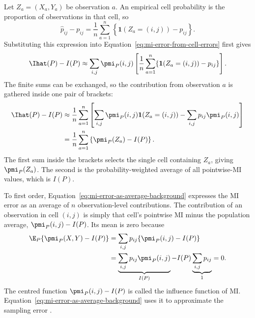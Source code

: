 Let \(Z_a=(X_a,Y_a)\) be observation \(a\). An empirical cell probability is
the proportion of observations in that cell, so
\begin{equation}
  \widehat p_{ij}-p_{ij}
  =
  \frac{1}{n}\sum_{a=1}^{n}
  \left\{\mathbf 1(Z_a=(i,j))-p_{ij}\right\}.
  \label{eq:cell-error-as-average}
\end{equation}
Substituting this expression into Equation~\eqref{eq:mi-error-from-cell-errors}
first gives
\begin{equation}
  \Ihat(P)-I(P)
  \approx
  \sum_{i,j}\pmi_P(i,j)
  \left[
    \frac{1}{n}\sum_{a=1}^{n}
    \{\mathbf 1(Z_a=(i,j))-p_{ij}\}
  \right].
  \label{eq:mi-error-double-sum-background}
\end{equation}
The finite sums can be exchanged, so the contribution from observation \(a\)
is gathered inside one pair of brackets:
\begin{align}
  \Ihat(P)-I(P)
  &\approx
  \frac{1}{n}\sum_{a=1}^{n}
  \left[
    \sum_{i,j}\pmi_P(i,j)\mathbf 1(Z_a=(i,j))
    -\sum_{i,j}p_{ij}\pmi_P(i,j)
  \right]
  \notag\\
  &=\frac{1}{n}\sum_{a=1}^{n}
  \left\{\pmi_P(Z_a)-I(P)\right\}.
  \label{eq:mi-error-as-average-background}
\end{align}
The first sum inside the brackets selects the single cell containing
\(Z_a\), giving \(\pmi_P(Z_a)\). The second is the probability-weighted
average of all pointwise-MI values, which is \(I(P)\).

To first order, Equation~\eqref{eq:mi-error-as-average-background} expresses
the MI error as an average of \(n\) observation-level contributions.
The contribution of an observation in cell \((i,j)\) is simply that cell's
pointwise MI minus the population average, \(\pmi_P(i,j)-I(P)\). Its mean is
zero because
\begin{align}
  \E_P\{\pmi_P(X,Y)-I(P)\}
  &=\sum_{i,j}p_{ij}\{\pmi_P(i,j)-I(P)\}
  \notag\\
  &=\underbrace{\sum_{i,j}p_{ij}\pmi_P(i,j)}_{I(P)}
    -I(P)\underbrace{\sum_{i,j}p_{ij}}_{1}
  =0.
  \label{eq:mi-if-mean-zero-background}
\end{align}
The centred function \(\pmi_P(i,j)-I(P)\) is called the influence function
of MI\@. Equation~\eqref{eq:mi-error-as-average-background} uses it to
approximate the sampling error \citep{hampel1974,vanderVaart1998,kandasamy2015}.

\medskip
{}

